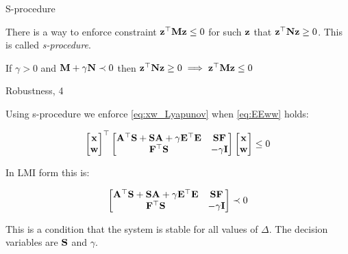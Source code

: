 \documentclass{beamer}
\begin{document}
\begin{frame}{S-procedure}
	\begin{flushleft}
		
		There is a way to enforce constraint $\mathbf{z}^\top \mathbf{M}\mathbf{z} \leq 0$ for such $\mathbf{z}$ that $\mathbf{z}^\top \mathbf{N}\mathbf{z} \geq 0$. This is called \emph{s-procedure}.
		
		\begin{theorem}[S-procedure]
			If $\gamma > 0$ and $\mathbf{M} + \gamma \mathbf{N} \prec 0$ then $\mathbf{z}^\top \mathbf{N}\mathbf{z} \geq 0 \implies \mathbf{z}^\top \mathbf{M}\mathbf{z} \leq 0$ 
		\end{theorem}
		
	\end{flushleft}
\end{frame}



\begin{frame}{Robustness, 4}
	\begin{flushleft}
		
		
		Using s-procedure we enforce \eqref{eq:xw_Lyapunov} when \eqref{eq:EEww} holds:
		
		\begin{equation}
			\begin{bmatrix}
				\mathbf{x} \\ \mathbf{w}
			\end{bmatrix}^\top
			\begin{bmatrix}
				\mathbf{A}^\top \mathbf{S} + \mathbf{S}\mathbf{A} + \gamma \mathbf{E}^\top \mathbf{E} & \mathbf{S}\mathbf{F} \\
				\mathbf{F}^\top\mathbf{S} & -\gamma\mathbf{I}
			\end{bmatrix}		
			\begin{bmatrix}
				\mathbf{x} \\ \mathbf{w}
			\end{bmatrix}
			\leq 0
		\end{equation}
		
		In LMI form this is:
		
		\begin{equation}
			\begin{bmatrix}
				\mathbf{A}^\top \mathbf{S} + \mathbf{S}\mathbf{A} + \gamma \mathbf{E}^\top \mathbf{E} & \mathbf{S}\mathbf{F} \\
				\mathbf{F}^\top\mathbf{S} & -\gamma\mathbf{I}
			\end{bmatrix}		
			\prec 0
		\end{equation}	
		
		
		This is a condition that the system is stable for all values of $\Delta$. The decision variables are $\mathbf{S}$ and $\gamma$.		
		
	\end{flushleft}
\end{frame}
\end{document}
